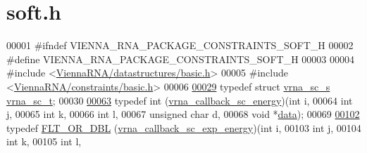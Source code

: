 \hypertarget{soft_8h_source}{}\section{soft.\+h}
\label{soft_8h_source}

\begin{DoxyCode}
00001 \textcolor{preprocessor}{#ifndef VIENNA\_RNA\_PACKAGE\_CONSTRAINTS\_SOFT\_H}
00002 \textcolor{preprocessor}{#define VIENNA\_RNA\_PACKAGE\_CONSTRAINTS\_SOFT\_H}
00003 
00004 \textcolor{preprocessor}{#include <\hyperlink{datastructures_2basic_8h}{ViennaRNA/datastructures/basic.h}>}
00005 \textcolor{preprocessor}{#include <\hyperlink{constraints_2basic_8h}{ViennaRNA/constraints/basic.h}>}
00006 
\hyperlink{group__soft__constraints_ga75401ce219ef8dbcceb672db82d434c6}{00029} \textcolor{keyword}{typedef} \textcolor{keyword}{struct  }\hyperlink{group__soft__constraints_structvrna__sc__s}{vrna\_sc\_s} \hyperlink{group__soft__constraints_structvrna__sc__s}{vrna\_sc\_t};
00030 
\hyperlink{group__soft__constraints_ga88a266695d9e25cc12114dceb7b4565e}{00063} \textcolor{keyword}{typedef} int (\hyperlink{group__soft__constraints_ga88a266695d9e25cc12114dceb7b4565e}{vrna\_callback\_sc\_energy})(\textcolor{keywordtype}{int}           i,
00064                                       \textcolor{keywordtype}{int}           j,
00065                                       \textcolor{keywordtype}{int}           k,
00066                                       \textcolor{keywordtype}{int}           l,
00067                                       \textcolor{keywordtype}{unsigned} \textcolor{keywordtype}{char} d,
00068                                       \textcolor{keywordtype}{void}          *\hyperlink{group__soft__constraints_a7574680143df97b9029146c2150bf06d}{data});
00069 
\hyperlink{group__soft__constraints_ga4099978d410513edeeff8f3db13144c5}{00102} \textcolor{keyword}{typedef} \hyperlink{group__data__structures_ga31125aeace516926bf7f251f759b6126}{FLT\_OR\_DBL} (\hyperlink{group__soft__constraints_ga4099978d410513edeeff8f3db13144c5}{vrna\_callback\_sc\_exp\_energy})(\textcolor{keywordtype}{int}            i,
00103                                                  \textcolor{keywordtype}{int}            j,
00104                                                  \textcolor{keywordtype}{int}            k,
00105                                                  \textcolor{keywordtype}{int}            l,

\end{DoxyCode}

